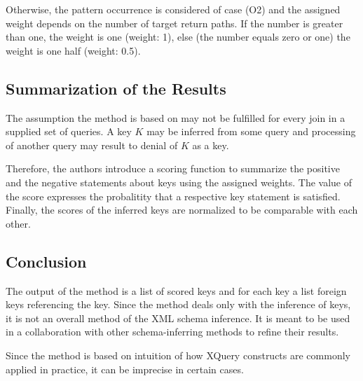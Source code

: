 Otherwise, the pattern occurrence is considered of case (O2) and the assigned weight depends on the number of target return paths. If the number is greater than one, the weight is one (weight: 1), else (the number equals zero or one) the weight is one half (weight: 0.5).

\subsection{Summarization of the Results}

The assumption the method is based on may not be fulfilled for every join in a supplied set of queries. A key $K$ may be inferred from some query and processing of another query may result to denial of $K$ as a key. 

Therefore, the authors introduce a scoring function to summarize the positive and the negative statements about keys using the assigned weights. The value of the score expresses the probalitity that a respective key statement is satisfied. Finally, the scores of the inferred keys are normalized to be comparable with each other.

\subsection{Conclusion}
The output of the method is a list of scored keys and for each key a list foreign keys referencing the key. Since the method deals only with the inference of keys, it is not an overall method of the XML schema inference. It is meant to be used in a collaboration with other schema-inferring methods to refine their results.

Since the method is based on intuition of how XQuery constructs are commonly applied in practice, it can be imprecise in certain cases.

